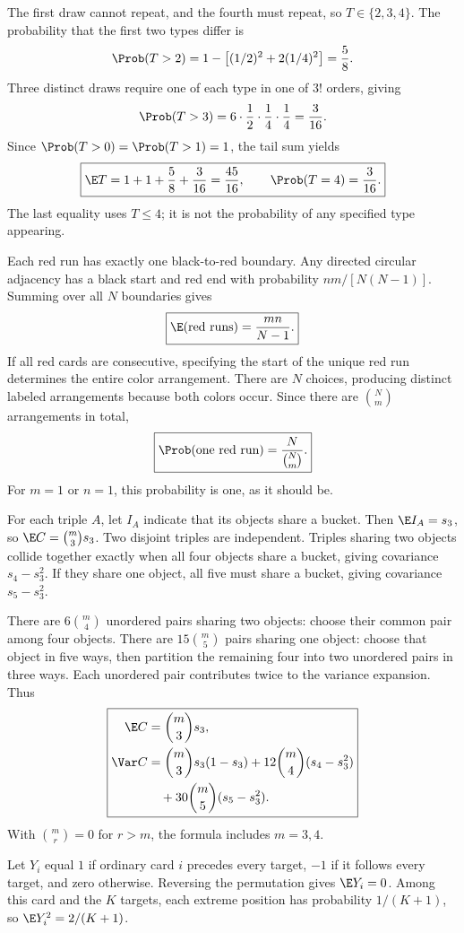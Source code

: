 The first draw cannot repeat, and the fourth must repeat, so $T\in\{2,3,4\}$. The probability that the first two types differ is
\[
\Prob(T>2)=1-\left[(1/2)^2+2(1/4)^2\right]=\frac58.
\]
Three distinct draws require one of each type in one of $3!$ orders, giving
\[
\Prob(T>3)=6\cdot\frac12\cdot\frac14\cdot\frac14=\frac3{16}.
\]
Since $\Prob(T>0)=\Prob(T>1)=1$, the tail sum yields
\[
\boxed{\E T=1+1+\frac58+\frac3{16}=\frac{45}{16},
\qquad \Prob(T=4)=\frac3{16}.}
\]
The last equality uses $T\le4$; it is not the probability of any specified type appearing.

Each red run has exactly one black-to-red boundary. Any directed circular adjacency has a black start and red end with probability $nm/[N(N-1)]$. Summing over all $N$ boundaries gives
\[
\boxed{\E(\text{red runs})=\frac{mn}{N-1}.}
\]
If all red cards are consecutive, specifying the start of the unique red run determines the entire color arrangement. There are $N$ choices, producing distinct labeled arrangements because both colors occur. Since there are $\binom Nm$ arrangements in total,
\[
\boxed{\Prob(\text{one red run})=\frac N{\binom Nm}.}
\]
For $m=1$ or $n=1$, this probability is one, as it should be.

For each triple $A$, let $I_A$ indicate that its objects share a bucket. Then $\E I_A=s_3$, so $\E C=\binom m3s_3$. Two disjoint triples are independent. Triples sharing two objects collide together exactly when all four objects share a bucket, giving covariance $s_4-s_3^2$. If they share one object, all five must share a bucket, giving covariance $s_5-s_3^2$.

There are $6\binom m4$ unordered pairs sharing two objects: choose their common pair among four objects. There are $15\binom m5$ pairs sharing one object: choose that object in five ways, then partition the remaining four into two unordered pairs in three ways. Each unordered pair contributes twice to the variance expansion. Thus
\[
\boxed{\begin{aligned}
\E C&=\binom m3s_3,\\
\Var C&=\binom m3s_3(1-s_3)
+12\binom m4(s_4-s_3^2)\\
&\quad+30\binom m5(s_5-s_3^2).
\end{aligned}}
\]
With $\binom mr=0$ for $r>m$, the formula includes $m=3,4$.

Let $Y_i$ equal $1$ if ordinary card $i$ precedes every target, $-1$ if it follows every target, and zero otherwise. Reversing the permutation gives $\E Y_i=0$. Among this card and the $K$ targets, each extreme position has probability $1/(K+1)$, so $\E Y_i^2=2/(K+1)$.


